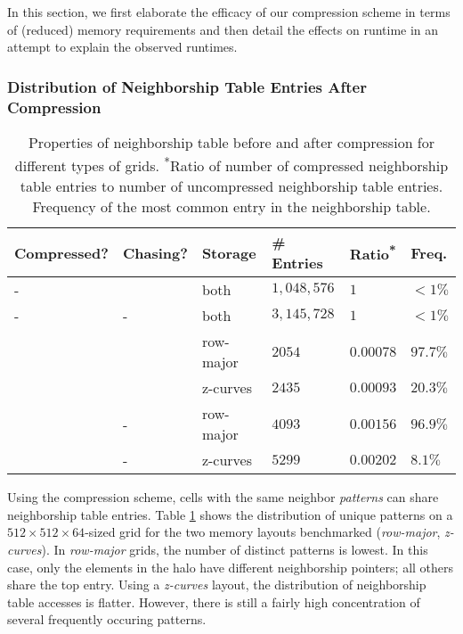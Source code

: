 In this section, we first elaborate the efficacy of our compression scheme in terms of (reduced) memory requirements and then detail the effects on runtime in an attempt to explain the observed runtimes.

\subsubsection{Distribution of Neighborship Table Entries After Compression}

\begin{table}
	\begin{tabular}{l l l l l l}
		\hline
		\textbf{Compressed?} & \textbf{Chasing?} & \textbf{Storage} & \textbf{\# Entries} & \textbf{Ratio\textsuperscript{*}} & \textbf{Freq.\textsuperscript{\dag}} \\
		\hline
		\hline
		- & \checkmark & both & $1,048,576$ & $1$ & $<1\%$\\
		- & - & both & $3,145,728$ & $1$ & $<1\%$\\
		\checkmark & \checkmark & row-major & $2054$ & $0.00078$ & $97.7\%$ \\
		\checkmark & \checkmark & z-curves & $2435$ & $0.00093$ & $20.3\%$ \\
		\checkmark & - & row-major & $4093$ & $0.00156$ & $96.9\%$ \\
		\checkmark & - & z-curves & $5299$ & $0.00202$ & $8.1\%$ \\
		\hline
	\end{tabular}
	\caption{\label{tab:compression} Properties of neighborship table before and after compression for different types of grids. \textsuperscript{*}Ratio of number of compressed neighborship table entries to number of uncompressed neighborship table entries. \textsuperscript{\dag}Frequency of the most common entry in the neighborship table. }
\end{table}

Using the compression scheme, cells with the same neighbor \emph{patterns} can share neighborship table entries. Table \ref{tab:compression} shows the distribution of unique patterns on a $512\times 512\times 64$-sized grid for the two memory layouts benchmarked (\emph{row-major}, \emph{z-curves}). In \emph{row-major} grids, the number of distinct patterns is lowest. In this case, only the elements in the halo have different neighborship pointers; all others share the top entry. Using a \emph{z-curves} layout, the distribution of neighborship table accesses is flatter. However, there is still a fairly high concentration of several frequently occuring patterns.

